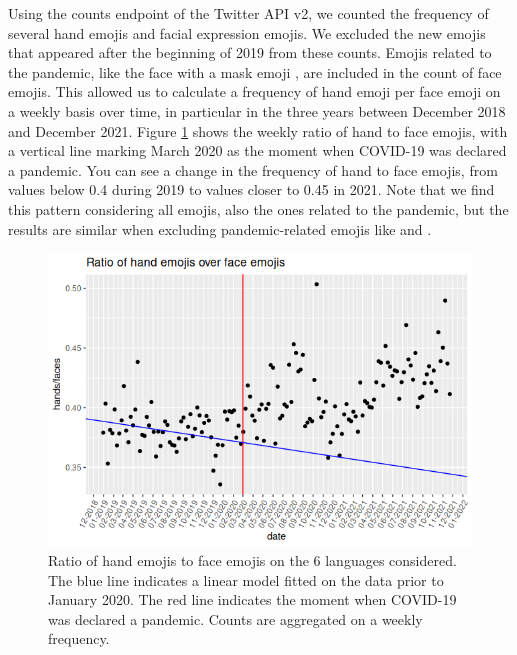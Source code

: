 \documentclass{article}
\begin{document}
Using the counts endpoint of the Twitter API v2, we counted the frequency of several hand emojis and facial expression emojis. We excluded the new emojis that appeared after the beginning of 2019 from these counts. Emojis related to the pandemic, like the face with a mask emoji , are included in the count of face emojis. This allowed us to calculate a frequency of hand emoji per face emoji on a weekly basis over time, in particular in the three years between December 2018 and December 2021. Figure \ref{fig:ratio} shows the weekly ratio of hand to face emojis, with a vertical line marking March 2020 as the moment when COVID-19 was declared a pandemic. You can see a change in the frequency of hand to face emojis, from values below 0.4 during 2019 to values closer to 0.45 in 2021. Note that we find this pattern considering all emojis, also the ones related to the pandemic, but the results are similar when excluding pandemic-related emojis like  and .

\begin{figure}[hbtp]
    \centering
    \includegraphics[width=0.9\linewidth]{Plots/ratio_all_weekly.png}
    \caption{Ratio of hand emojis to face emojis on the 6 languages considered. The blue line indicates a linear model fitted on the data prior to January 2020. The red line indicates the moment when COVID-19 was declared a pandemic. Counts are aggregated on a weekly frequency.}
    \label{fig:ratio}
\end{figure}
\end{document}
